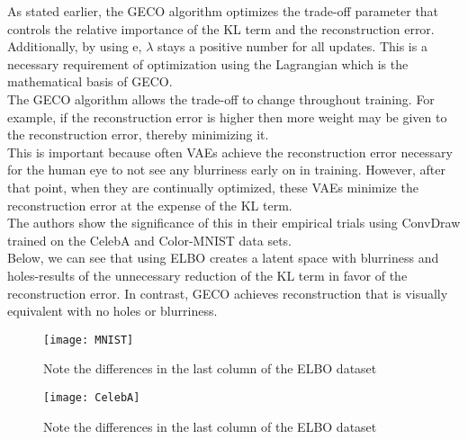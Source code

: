 As stated earlier, the GECO algorithm optimizes the trade-off parameter that controls the relative importance of the KL term and the reconstruction error.\\
Additionally, by using e, $\lambda$ stays a positive number for all updates. This is a necessary requirement of optimization using the Lagrangian which is the mathematical basis of GECO. \\
The GECO algorithm allows the trade-off to change throughout training. For example, if the reconstruction error is higher then more weight may be given to the reconstruction error, thereby minimizing it.\\
This is important because often VAEs achieve the reconstruction error necessary for the human eye to not see any blurriness early on in training. However, after that point, when they are continually optimized, these VAEs minimize the reconstruction error at the expense of the KL term.\\
The authors show the significance of this in their empirical trials using ConvDraw trained on the CelebA and Color-MNIST data sets.\\
Below, we can see that using ELBO creates a latent space with blurriness and holes-results of the unnecessary reduction of the KL term in favor of the reconstruction error. In contrast, GECO achieves reconstruction that is visually equivalent with no holes or blurriness.\\

\begin{figure}[t]
\texttt{[image: MNIST]}
\caption{Note the differences in the last column of the ELBO dataset}
\centering
\end{figure}
\begin{figure}[t]
\texttt{[image: CelebA]}
\caption{Note the differences in the last column of the ELBO dataset}
\centering
\end{figure}

	
